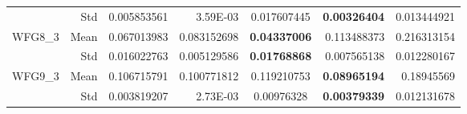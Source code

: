 \begin{table*}[htbp]
\begin{tabular}{rrrrrrr}
          & Std   & 0.005853561 & 3.59E-03 & \multicolumn{1}{c}{0.017607445} & \textbf{0.00326404} & 0.013444921 \\
    \multirow{2}[0]{*}{WFG8\_3} & Mean  & 0.067013983 & 0.083152698 & \multicolumn{1}{c}{\textbf{0.04337006}} & 0.113488373 & 0.216313154 \\
          & Std   & 0.016022763 & 0.005129586 & \multicolumn{1}{c}{\textbf{0.01768868}} & 0.007565138 & 0.012280167 \\
    \multirow{2}[0]{*}{WFG9\_3} & Mean  & 0.106715791 & 0.100771812 & \multicolumn{1}{c}{0.119210753} & \textbf{0.08965194} & 0.18945569 \\
          & Std   & 0.003819207 & 2.73E-03 & \multicolumn{1}{c}{0.00976328} & \textbf{0.00379339} & 0.012131678 \\
    \bottomrule
    \end{tabular}%
  \label{tab:WFG3SP}%
\end{table*}%
